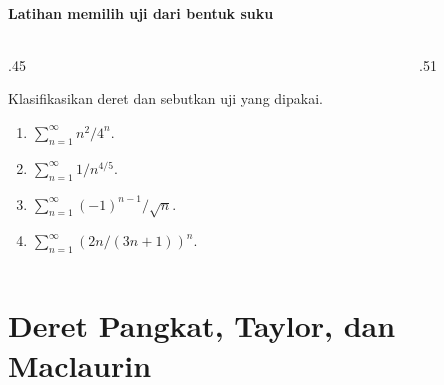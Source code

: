 \documentclass{../../kalkulus-ppt}
\begin{document}
\begin{frame}{\insertsection}
    \framesubtitle{Latihan memilih uji dari bentuk suku}
    \begin{columns}[T,onlytextwidth]
        \begin{column}{.45\textwidth}
            \begin{latihan}
                Klasifikasikan deret dan sebutkan uji yang dipakai.
                \begin{enumerate}
                    \item $\sum_{n=1}^\infty n^2/4^n$.
                    \item $\sum_{n=1}^\infty 1/n^{4/5}$.
                    \item $\sum_{n=1}^\infty (-1)^{n-1}/\sqrt n$.
                    \item $\sum_{n=1}^\infty (2n/(3n+1))^n$.
                \end{enumerate}
            \end{latihan}
        \end{column}
        \begin{column}{.51\textwidth}
        \end{column}
    \end{columns}
\end{frame}

\section{Deret Pangkat, Taylor, dan Maclaurin}
\end{document}
